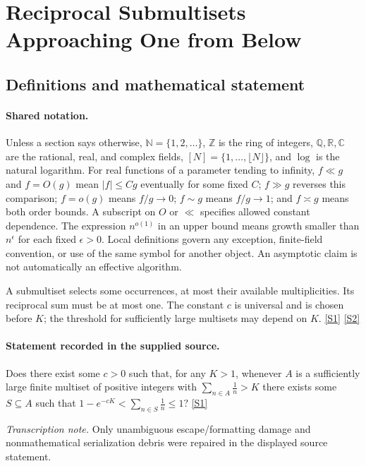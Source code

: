 \documentclass[11pt,a4paper]{article}
\newcommand{\N}{\mathbb{N}}
\newcommand{\Z}{\mathbb{Z}}
\newcommand{\Q}{\mathbb{Q}}
\newcommand{\R}{\mathbb{R}}
\newcommand{\C}{\mathbb{C}}
\newcommand{\sref}[2]{\hyperlink{source:#1:#2}{[S#2]}}
\begin{document}
\section{Reciprocal Submultisets Approaching One from Below}\label{statement}


\subsection{Definitions and mathematical statement}

\paragraph{Shared notation.}Unless a section says otherwise, $\N=\{1,2,\ldots\}$,
$\Z$ is the ring of integers, $\Q,\R,\C$ are the rational, real, and complex
fields, $[N]=\{1,\ldots,\lfloor N\rfloor\}$, and $\log$ is the natural
logarithm. For real functions of a parameter tending to infinity,
$f\ll g$ and $f=O(g)$ mean $|f|\leq Cg$ eventually for some fixed $C$;
$f\gg g$ reverses this comparison; $f=o(g)$ means $f/g\to0$;
$f\sim g$ means $f/g\to1$; and $f\asymp g$ means both order bounds.
A subscript on $O$ or $\ll$ specifies allowed constant dependence.
The expression $n^{o(1)}$ in an upper bound means growth smaller than
$n^\epsilon$ for each fixed $\epsilon>0$. Local definitions govern any
exception, finite-field convention, or use of the same symbol for another
object. An asymptotic claim is not automatically an effective algorithm.



A submultiset selects some occurrences, at most their available multiplicities. Its reciprocal sum must be at most one. The constant $c$ is universal and is chosen before $K$; the threshold for sufficiently large multisets may depend on $K$. \sref{statement}{1} \sref{statement}{2}

\paragraph{Statement recorded in the supplied source.}
Does there exist some $c>0$ such that, for any $K>1$, whenever $A$ is a sufficiently large finite multiset of positive integers with $\sum_{n\in A}\frac{1}{n}>K$ there exists some $S\subseteq A$ such that $ 1-e^{-cK} < \sum_{n\in S}\frac{1}{n}\leq 1? $ \sref{statement}{1}

{\small\emph{Transcription note.} Only unambiguous escape/formatting damage and nonmathematical serialization debris were repaired in the displayed source statement.}
\end{document}
